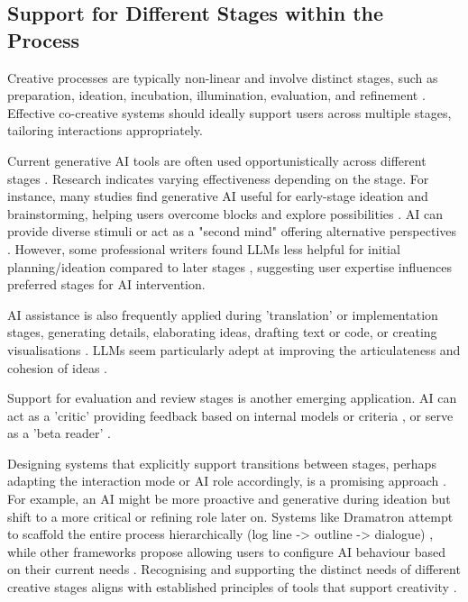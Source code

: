 \subsection{Support for Different Stages within the Process}

Creative processes are typically non-linear and involve distinct stages, such as preparation, ideation, incubation, illumination, evaluation, and refinement \cite{Wallas1926-ky, Design-Council2004-fv}. Effective co-creative systems should ideally support users across multiple stages, tailoring interactions appropriately.

Current generative AI tools are often used opportunistically across different stages \cite{Li2024-yh}. Research indicates varying effectiveness depending on the stage. For instance, many studies find generative AI useful for early-stage ideation and brainstorming, helping users overcome blocks and explore possibilities \cite{Calderwood2020-gg, Clark2018-yf, Wan2023-he, Mirowski2023-oz, Doshi2023-dv}. AI can provide diverse stimuli \cite{Haase2023-mz} or act as a "second mind" offering alternative perspectives \cite{Wan2023-he}. However, some professional writers found LLMs less helpful for initial planning/ideation compared to later stages \cite{Chakrabarty2024-ov}, suggesting user expertise influences preferred stages for AI intervention.

AI assistance is also frequently applied during 'translation' or implementation stages, generating details, elaborating ideas, drafting text or code, or creating visualisations \cite{Chakrabarty2024-ov, Yuan2022-kb, Lee2024-vz, Palani2024-on}. LLMs seem particularly adept at improving the articulateness and cohesion of ideas \cite{Lee2024-vz}.

Support for evaluation and review stages is another emerging application. AI can act as a 'critic' providing feedback based on internal models or criteria \cite{Lin2023-zq, Zhou2024-vp}, or serve as a 'beta reader' \cite{Ippolito2022-mf, Chakrabarty2024-ov}. 

Designing systems that explicitly support transitions between stages, perhaps adapting the interaction mode or AI role accordingly, is a promising approach \cite{Wan2023-he, Ding2024-ta}. For example, an AI might be more proactive and generative during ideation but shift to a more critical or refining role later on. Systems like Dramatron attempt to scaffold the entire process hierarchically (log line -> outline -> dialogue) \cite{Mirowski2023-oz}, while other frameworks propose allowing users to configure AI behaviour based on their current needs \cite{Moruzzi2024-cq}. Recognising and supporting the distinct needs of different creative stages aligns with established principles of tools that support creativity \cite{Resnick2005-fs, Weisz2024-io}.

